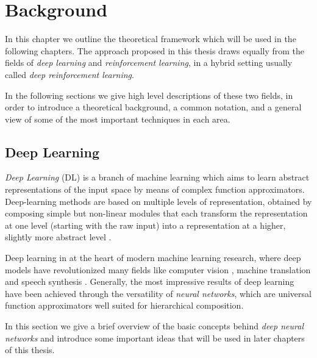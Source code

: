 \chapter{Background}
\label{chapter2_background}
\thispagestyle{empty}

\vspace{0.5cm}

In this chapter we outline the theoretical framework which will be 
used in the following chapters. The approach proposed in this thesis draws 
equally from the fields of \textit{deep learning} and 
\textit{reinforcement learning}, in a hybrid setting usually called 
\textit{deep reinforcement learning}.

In the following sections we give high level descriptions of these two fields, 
in order to introduce a theoretical background, a common notation, and a general
view of some of the most important techniques in each area. 

\section{Deep Learning} \label{s:DL}
\textit{Deep Learning} (DL) is a branch of machine learning which aims to learn
abstract representations of the input space by means of complex function 
approximators.  Deep-learning methods are based on multiple levels of 
representation, obtained by composing simple but non-linear modules that each 
transform the representation at one level (starting with the raw input) into a 
representation at a higher, slightly more abstract level \cite{lecun2015deep}.

Deep learning in at the heart of modern machine learning research, where deep 
models have revolutionized many fields like computer vision 
\cite{krizhevsky2012imagenet, szegedy2015going}, machine translation 
\cite{wu2016google} and speech synthesis \cite{vanwavenet}.
Generally, the most impressive results of deep learning have been achieved 
through the versatility of \textit{neural networks}, which are universal 
function approximators well suited for hierarchical composition.

In this section we give a brief overview of the basic concepts behind 
\textit{deep neural networks }and introduce some important ideas that will be 
used in later chapters of this thesis.

